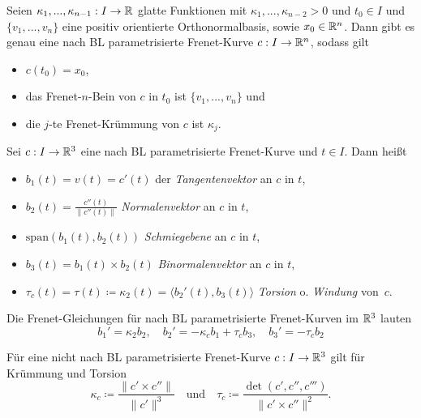 \documentclass{cheat-sheet}
\begin{document}

\begin{satz}
  Seien $\kappa_1, ..., \kappa_{n-1} : I \to \mathbb{R}$ glatte Funktionen mit $\kappa_1, ..., \kappa_{n-2} > 0$ und $t_0 \in I$ und $\{ v_1, ..., v_n \}$ eine positiv orientierte Orthonormalbasis, sowie $x_0 \in \mathbb{R}^n$. Dann gibt es genau eine nach BL parametrisierte Frenet-Kurve $c : I \to \mathbb{R}^n$, sodass gilt
  \begin{itemize}
    \item $c(t_0) = x_0$,
    \item das Frenet-$n$-Bein von $c$ in $t_0$ ist $\{ v_1, ..., v_n \}$ und
    \item die $j$-te Frenet-Krümmung von $c$ ist $\kappa_j$.
  \end{itemize}
\end{satz}

\begin{defn}
  Sei $c : I \to \mathbb{R}^3$ eine nach BL parametrisierte Frenet-Kurve und $t \in I$. Dann heißt
  \begin{itemize}
    \item $b_1(t) = v(t) = c'(t)$ der \emph{Tangentenvektor} an $c$ in $t$,
    \item $b_2(t) = \tfrac{c''(t)}{\| c''(t) \|}$ \emph{Normalenvektor} an $c$ in $t$,
    \item $\mathrm{span}(b_1(t), b_2(t))$ \emph{Schmiegebene} an $c$ in $t$,
    \item $b_3(t) = b_1(t) \times b_2(t)$ \emph{Binormalenvektor} an $c$ in $t$,
    \item $\tau_c(t) = \tau(t) \coloneqq \kappa_2(t) = \langle b_2'(t) , b_3(t) \rangle$ \emph{Torsion} o. \emph{Windung} von~$c$.
  \end{itemize}
\end{defn}

\begin{bem}
  Die Frenet-Gleichungen für nach BL parametrisierte Frenet-Kurven im $\mathbb{R}^3$ lauten
  \[
      b_1' = \kappa_2 b_2, \quad
      b_2' = - \kappa_c b_1 + \tau_c b_3, \quad
      b_3' = - \tau_c b_2
  \]
\end{bem}


\begin{bem}
  Für eine nicht nach BL parametrisierte Frenet-Kurve $c : I \to \mathbb{R}^3$ gilt für Krümmung und Torsion
  \[ \kappa_c \coloneqq \frac{\| c' \times c'' \|}{\| c' \|^3} \quad \text{und} \quad \tau_c \coloneqq \frac{\det(c', c'', c''')}{\| c' \times c'' \|^2}. \]
\end{bem}
\end{document}

